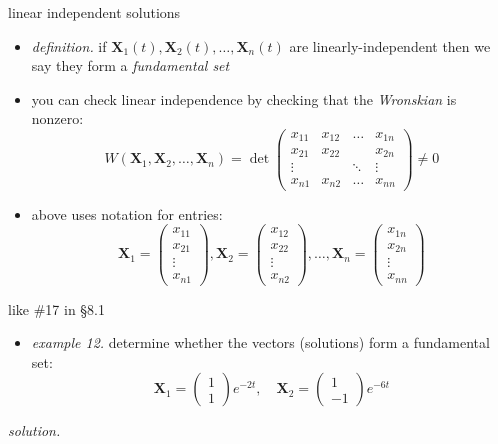 \documentclass[dvipsnames,colorlinks]{beamer}
\newcommand{\bX}{\mathbf{X}}
\begin{document}
\begin{frame}{linear independent solutions}

\begin{itemize}
\item \emph{definition.} if $\bX_1(t),\bX_2(t),\dots,\bX_n(t)$ are  linearly-independent then we say they form a \emph{fundamental set}
\item you can check linear independence by checking that the \emph{Wronskian} is nonzero:
    $$W\left(\bX_1,\bX_2,\dots,\bX_n\right) = \det \begin{pmatrix} x_{11} & x_{12} & \dots & x_{1n} \\ x_{21} & x_{22} &  & x_{2n} \\ \vdots & & \ddots & \vdots \\ x_{n1} & x_{n2} & \dots & x_{nn} \end{pmatrix} \ne 0$$
\item above uses notation for entries:
    $$\bX_1 = \begin{pmatrix} x_{11} \\ x_{21} \\ \vdots \\ x_{n1} \end{pmatrix}, \bX_2 = \begin{pmatrix} x_{12} \\ x_{22} \\ \vdots \\ x_{n2} \end{pmatrix}, \dots, \bX_n = \begin{pmatrix} x_{1n} \\ x_{2n} \\ \vdots \\ x_{nn} \end{pmatrix}$$
\end{itemize}
\end{frame}


\begin{frame}{like \#17 in \S8.1}

\begin{itemize}
\item \emph{example 12.}  determine whether the vectors (solutions) form a fundamental set:
    $$\bX_1 = \begin{pmatrix} 1 \\ 1 \end{pmatrix} e^{-2t}, \quad \bX_2 = \begin{pmatrix} 1 \\ -1 \end{pmatrix} e^{-6t}$$
\end{itemize}

\noindent \emph{solution.}

\vspace{40mm}
\end{frame}
\end{document}
